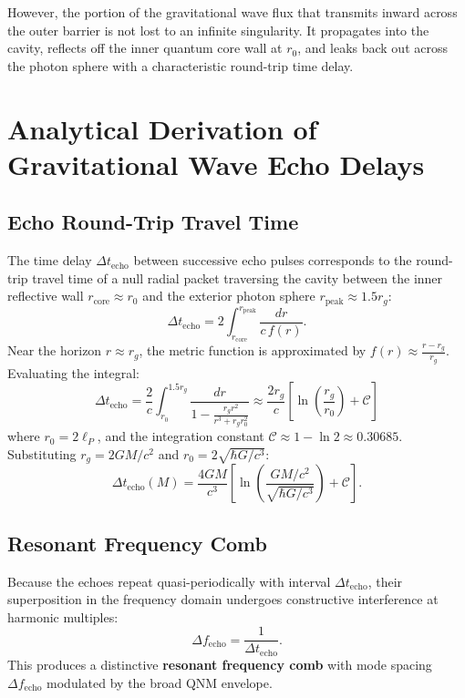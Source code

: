 \documentclass[11pt,a4paper]{article}
\begin{document}
However, the portion of the gravitational wave flux that transmits inward across the outer barrier is not lost to an infinite singularity. It propagates into the cavity, reflects off the inner quantum core wall at $r_0$, and leaks back out across the photon sphere with a characteristic round-trip time delay.

\section{Analytical Derivation of Gravitational Wave Echo Delays}

\subsection{Echo Round-Trip Travel Time}
The time delay $\Delta t_{\mathrm{echo}}$ between successive echo pulses corresponds to the round-trip travel time of a null radial packet traversing the cavity between the inner reflective wall $r_{\mathrm{core}} \approx r_0$ and the exterior photon sphere $r_{\mathrm{peak}} \approx 1.5 r_g$:
\begin{equation}
\Delta t_{\mathrm{echo}} = 2 \int_{r_{\mathrm{core}}}^{r_{\mathrm{peak}}} \frac{dr}{c \, f(r)}.
\end{equation}
Near the horizon $r \approx r_g$, the metric function is approximated by $f(r) \approx \frac{r - r_g}{r_g}$. Evaluating the integral:
\begin{equation}
\Delta t_{\mathrm{echo}} = \frac{2}{c} \int_{r_0}^{1.5 r_g} \frac{dr}{1 - \frac{r_g r^2}{r^3 + r_g r_0^2}} \approx \frac{2 r_g}{c} \left[ \ln\left( \frac{r_g}{r_0} \right) + \mathcal{C} \right]
\end{equation}
where $r_0 = 2\ell_P$, and the integration constant $\mathcal{C} \approx 1 - \ln 2 \approx 0.30685$.
Substituting $r_g = 2GM/c^2$ and $r_0 = 2\sqrt{\hbar G/c^3}$:
\begin{equation}
\Delta t_{\mathrm{echo}}(M) = \frac{4 G M}{c^3} \left[ \ln\left( \frac{G M / c^2}{\sqrt{\hbar G / c^3}} \right) + \mathcal{C} \right].
\end{equation}

\subsection{Resonant Frequency Comb}
Because the echoes repeat quasi-periodically with interval $\Delta t_{\mathrm{echo}}$, their superposition in the frequency domain undergoes constructive interference at harmonic multiples:
\begin{equation}
\Delta f_{\mathrm{echo}} = \frac{1}{\Delta t_{\mathrm{echo}}}.
\end{equation}
This produces a distinctive \textbf{resonant frequency comb} with mode spacing $\Delta f_{\mathrm{echo}}$ modulated by the broad QNM envelope.
\end{document}
